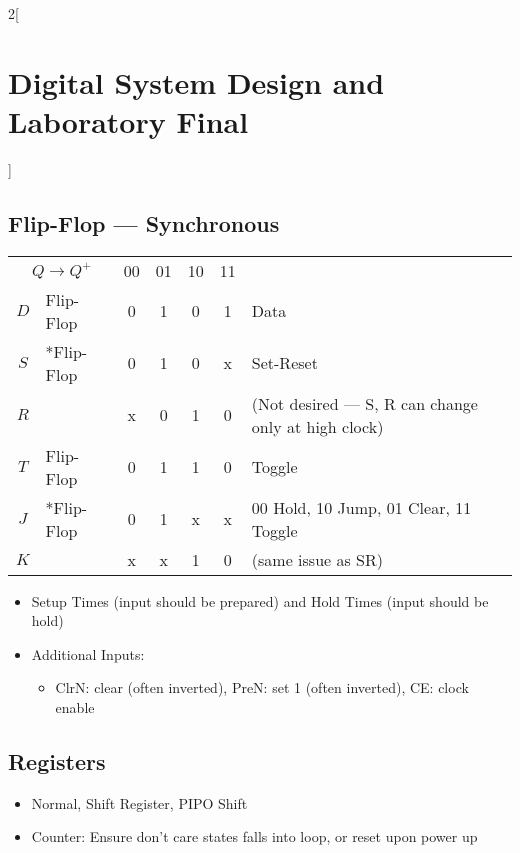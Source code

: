 \documentclass[10pt,a4paper,twoside]{article}
\begin{document}
\begin{multicols}{2}[\section*{Digital System Design and Laboratory Final}]
		\subsection*{Flip-Flop --- Synchronous}
		\begin{center}
			\begin{tabular}{|cl|c|c|c|c|l} \cline{1-6}
				\multicolumn{2}{|c|}{$Q \to Q^+$} & 00 & 01 & 10 & 11 \\\cline{1-6}
				$D$ & \hspace{-.5em}Flip-Flop 					& 0 & 1 & 0 & 1 
				& Data\\\cline{1-6}
				$S$ & \hspace{-.5em}\multirow{2}*{Flip-Flop} 	& 0 & 1 & 0 & {\color{lightgray}x} 
				& Set-Reset \\
				$R$ & 											& {\color{lightgray}x} & 0 & 1 & 0 
				& (Not desired --- S, R can change only at high clock) \\\cline{1-6}
				$T$ & \hspace{-.5em}Flip-Flop 					& 0 & 1 & 1 & 0 
				& Toggle \\\cline{1-6}
				$J$ & \hspace{-.5em}\multirow{2}*{Flip-Flop} 	& 0 & 1 & {\color{lightgray}x} & {\color{lightgray}x} 
				& 00 Hold, 10 Jump, 01 Clear, 11 Toggle \\
				$K$ & 											& {\color{lightgray}x} & {\color{lightgray}x} & 1 & 0 
				& (same issue as SR)\\\cline{1-6}
			\end{tabular}
		\end{center}
		\begin{itemize}
			\item Setup Times (input should be prepared) and Hold Times (input should be hold)
			\item Additional Inputs:
			\begin{itemize}
				\item ClrN: clear (often inverted), PreN: set 1 (often inverted), CE: clock enable
			\end{itemize}
		\end{itemize}
		
		
		
		
		\subsection*{Registers}
		\begin{itemize}
			\item Normal, Shift Register, PIPO Shift
			\item Counter: Ensure don't care states falls into loop, or reset upon power up
		\end{itemize}

\end{multicols}
\end{document}
